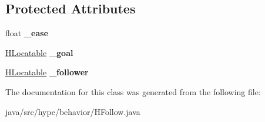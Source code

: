\subsection*{Protected Attributes}
\begin{DoxyCompactItemize}
\item 
\hypertarget{classhype_1_1behavior_1_1_h_follow_a37c6ea2c768435a71cab8cc695526612}{float {\bfseries \-\_\-ease}}\label{classhype_1_1behavior_1_1_h_follow_a37c6ea2c768435a71cab8cc695526612}

\item 
\hypertarget{classhype_1_1behavior_1_1_h_follow_a9c774922dc7ef22703be4bd8762ba131}{\hyperlink{interfacehype_1_1interfaces_1_1_h_locatable}{H\-Locatable} {\bfseries \-\_\-goal}}\label{classhype_1_1behavior_1_1_h_follow_a9c774922dc7ef22703be4bd8762ba131}

\item 
\hypertarget{classhype_1_1behavior_1_1_h_follow_ab75b456b17c259986c8fb7e46d0bb920}{\hyperlink{interfacehype_1_1interfaces_1_1_h_locatable}{H\-Locatable} {\bfseries \-\_\-follower}}\label{classhype_1_1behavior_1_1_h_follow_ab75b456b17c259986c8fb7e46d0bb920}

\end{DoxyCompactItemize}


The documentation for this class was generated from the following file\-:\begin{DoxyCompactItemize}
\item 
java/src/hype/behavior/H\-Follow.\-java\end{DoxyCompactItemize}
